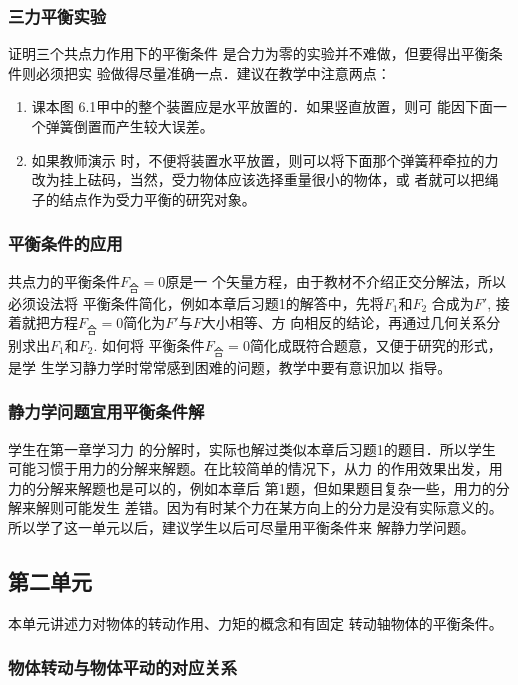 \subsubsection{三力平衡实验}

证明三个共点力作用下的平衡条件
是合力为零的实验并不难做，但要得出平衡条件则必须把实
验做得尽量准确一点．建议在教学中注意两点：
\begin{enumerate}
\item 课本图
6.1甲中的整个装置应是水平放置的．如果竖直放置，则可
能因下面一个弹簧倒置而产生较大误差。    
\item 如果教师演示
时，不便将装置水平放置，则可以将下面那个弹簧秤牵拉的力
改为挂上砝码，当然，受力物体应该选择重量很小的物体，或
者就可以把绳子的结点作为受力平衡的研究对象。
\end{enumerate}

\subsubsection{平衡条件的应用}

共点力的平衡条件$F_{\text{合}}=0$原是一
个矢量方程，由于教材不介绍正交分解法，所以必须设法将
平衡条件简化，例如本章后习题1的解答中，先将$F_1$和$F_2$
合成为$F'$, 接着就把方程$F_{\text{合}}=0$简化为$F'$与$F$大小相等、方
向相反的结论，再通过几何关系分别求出$F_1$和$F_2$. 如何将
平衡条件$F_{\text{合}}=0$简化成既符合题意，又便于研究的形式，是学
生学习静力学时常常感到困难的问题，教学中要有意识加以
指导。

\subsubsection{静力学问题宜用平衡条件解}

学生在第一章学习力
的分解时，实际也解过类似本章后习题1的题目．所以学生
可能习惯于用力的分解来解题。在比较简单的情况下，从力
的作用效果出发，用力的分解来解题也是可以的，例如本章后
第1题，但如果题目复杂一些，用力的分解来解则可能发生
差错。因为有时某个力在某方向上的分力是没有实际意义的。
所以学了这一单元以后，建议学生以后可尽量用平衡条件来
解静力学问题。


\subsection{第二单元}
本单元讲述力对物体的转动作用、力矩的概念和有固定
转动轴物体的平衡条件。
\subsubsection{物体转动与物体平动的对应关系}


